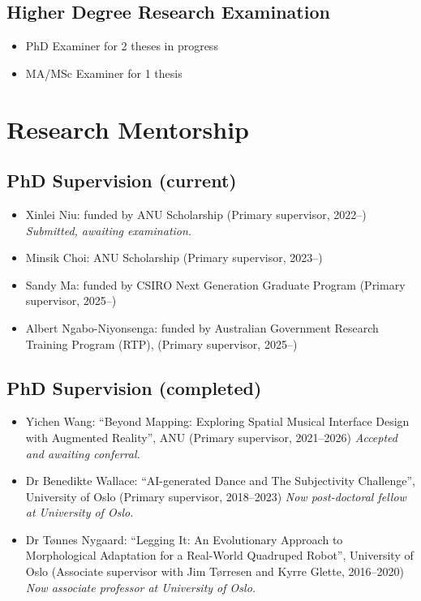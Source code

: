 \documentclass[11pt, a4paper, oneside]{article}
\begin{document}
\subsection*{Higher Degree Research Examination}

\begin{itemize}
\item PhD Examiner for 2 theses in progress
\item MA/MSc Examiner for 1 thesis
\end{itemize}

\pagebreak
\section{Research Mentorship}
\label{research-mentorship}

\subsection*{PhD Supervision (current)}

\begin{itemize}

\item Xinlei Niu: funded by ANU Scholarship (Primary supervisor, 2022--) \emph{Submitted, awaiting examination.}

\item Minsik Choi: ANU Scholarship (Primary supervisor, 2023--)

\item Sandy Ma: funded by CSIRO Next Generation Graduate Program (Primary supervisor, 2025--)

\item Albert Ngabo-Niyonsenga: funded by Australian Government Research Training Program (RTP), (Primary supervisor, 2025--)

\end{itemize}

\subsection*{PhD Supervision (completed)}

\begin{itemize}

\item Yichen Wang: ``Beyond Mapping: Exploring Spatial Musical Interface Design with Augmented Reality'', ANU (Primary supervisor, 2021--2026) \emph{Accepted and awaiting conferral.}

\item Dr Benedikte Wallace: ``AI-generated Dance and The Subjectivity Challenge'', University of Oslo (Primary supervisor, 2018--2023) \emph{Now post-doctoral fellow at University of Oslo.}

\item Dr Tønnes Nygaard: ``Legging It: An Evolutionary Approach to Morphological Adaptation for a Real-World Quadruped Robot'', University of Oslo (Associate supervisor with Jim Tørresen and Kyrre Glette, 2016--2020) \emph{Now associate professor at University of Oslo.}

\end{itemize}
\end{document}
